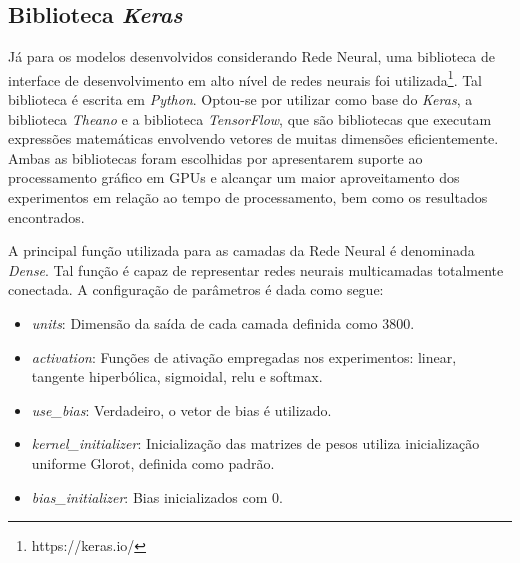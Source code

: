 \documentclass[conference]{IEEEtran}
\begin{document}
\subsection{Biblioteca \textit{Keras}} \label{sec:bib}

Já para os modelos desenvolvidos considerando Rede Neural, uma biblioteca de interface de desenvolvimento em alto nível de redes neurais foi utilizada\footnote{https://keras.io/}. Tal biblioteca é escrita em \emph{Python}. Optou-se por utilizar como base do \textit{Keras}, a biblioteca \textit{Theano} e a biblioteca \textit{TensorFlow}, que são bibliotecas que executam expressões matemáticas envolvendo vetores de muitas dimensões eficientemente. Ambas as bibliotecas foram escolhidas por apresentarem suporte ao processamento gráfico em GPUs e alcançar um maior aproveitamento dos experimentos em relação ao tempo de processamento, bem como os resultados encontrados.

A principal função utilizada para as camadas da Rede Neural é denominada \textit{Dense}. Tal função é capaz de representar redes neurais multicamadas totalmente conectada. A configuração de parâmetros é dada como segue:

\begin{itemize}
	\footnotesize \item \textit{units}: Dimensão da saída de cada camada definida como $3800$.
	\footnotesize \item \textit{activation}: Funções de ativação empregadas nos experimentos: linear, tangente hiperbólica, sigmoidal, relu e softmax. 
	\footnotesize \item \textit{use\_bias}: Verdadeiro, o vetor de bias é utilizado.
	\footnotesize \item \textit{kernel\_initializer}: Inicialização das matrizes de pesos utiliza inicialização uniforme Glorot, definida como padrão.
	\footnotesize \item \textit{bias\_initializer}: Bias inicializados com $0$.
\end{itemize}
\end{document}
